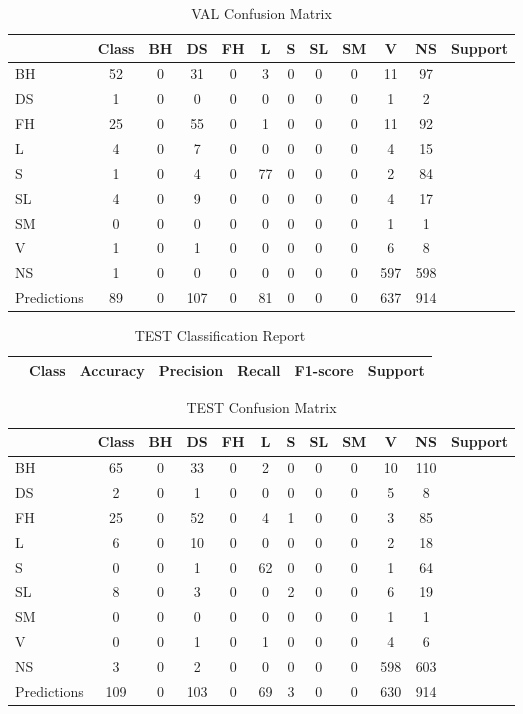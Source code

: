 \begin{table}[h]
\centering
\begin{tabular}{|l|c|c|c|c|c|c|c|c|c|c|} \hline
 & Class & BH & DS & FH & L & S & SL & SM & V & NS & Support \\ \hline
BH & 52 & 0 & 31 & 0 & 3 & 0 & 0 & 0 & 11 & 97 \\ \hline
DS & 1 & 0 & 0 & 0 & 0 & 0 & 0 & 0 & 1 & 2 \\ \hline
FH & 25 & 0 & 55 & 0 & 1 & 0 & 0 & 0 & 11 & 92 \\ \hline
L & 4 & 0 & 7 & 0 & 0 & 0 & 0 & 0 & 4 & 15 \\ \hline
S & 1 & 0 & 4 & 0 & 77 & 0 & 0 & 0 & 2 & 84 \\ \hline
SL & 4 & 0 & 9 & 0 & 0 & 0 & 0 & 0 & 4 & 17 \\ \hline
SM & 0 & 0 & 0 & 0 & 0 & 0 & 0 & 0 & 1 & 1 \\ \hline
V & 1 & 0 & 1 & 0 & 0 & 0 & 0 & 0 & 6 & 8 \\ \hline
NS & 1 & 0 & 0 & 0 & 0 & 0 & 0 & 0 & 597 & 598 \\ \hline
Predictions & 89 & 0 & 107 & 0 & 81 & 0 & 0 & 0 & 637 & 914 \\ \hline
\end{tabular}
\caption{VAL Confusion Matrix}
\label{tab:val_conf_matrix}
\end{table}

\begin{table}[h]
\centering
\begin{tabular}{|l|c|c|c|c|c|} \hline
 & Class & Accuracy & Precision & Recall & F1-score & Support \\ \hline
\end{tabular}
\caption{TEST Classification Report}
\label{tab:test_report}
\end{table}

\begin{table}[h]
\centering
\begin{tabular}{|l|c|c|c|c|c|c|c|c|c|c|} \hline
 & Class & BH & DS & FH & L & S & SL & SM & V & NS & Support \\ \hline
BH & 65 & 0 & 33 & 0 & 2 & 0 & 0 & 0 & 10 & 110 \\ \hline
DS & 2 & 0 & 1 & 0 & 0 & 0 & 0 & 0 & 5 & 8 \\ \hline
FH & 25 & 0 & 52 & 0 & 4 & 1 & 0 & 0 & 3 & 85 \\ \hline
L & 6 & 0 & 10 & 0 & 0 & 0 & 0 & 0 & 2 & 18 \\ \hline
S & 0 & 0 & 1 & 0 & 62 & 0 & 0 & 0 & 1 & 64 \\ \hline
SL & 8 & 0 & 3 & 0 & 0 & 2 & 0 & 0 & 6 & 19 \\ \hline
SM & 0 & 0 & 0 & 0 & 0 & 0 & 0 & 0 & 1 & 1 \\ \hline
V & 0 & 0 & 1 & 0 & 1 & 0 & 0 & 0 & 4 & 6 \\ \hline
NS & 3 & 0 & 2 & 0 & 0 & 0 & 0 & 0 & 598 & 603 \\ \hline
Predictions & 109 & 0 & 103 & 0 & 69 & 3 & 0 & 0 & 630 & 914 \\ \hline
\end{tabular}
\caption{TEST Confusion Matrix}
\label{tab:test_conf_matrix}
\end{table}

